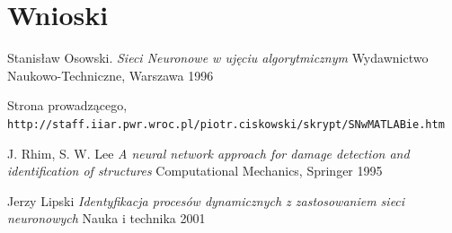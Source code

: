 \documentclass{article}
\begin{document}
\section{Wnioski}



\newpage
\begin{thebibliography}{9}

Stanisław Osowski.
\textit{Sieci Neuronowe w ujęciu algorytmicznym}
Wydawnictwo Naukowo-Techniczne, Warszawa 1996

Strona prowadzącego,
\\\texttt{http://staff.iiar.pwr.wroc.pl/piotr.ciskowski/skrypt/SNwMATLABie.htm}

J. Rhim, S. W. Lee 
\textit{A neural network approach for damage detection and identification of structures}
Computational Mechanics, Springer 1995

Jerzy Lipski
\textit{Identyfikacja procesów dynamicznych z zastosowaniem sieci neuronowych}
Nauka i technika 2001

\end{thebibliography}
\end{document}
